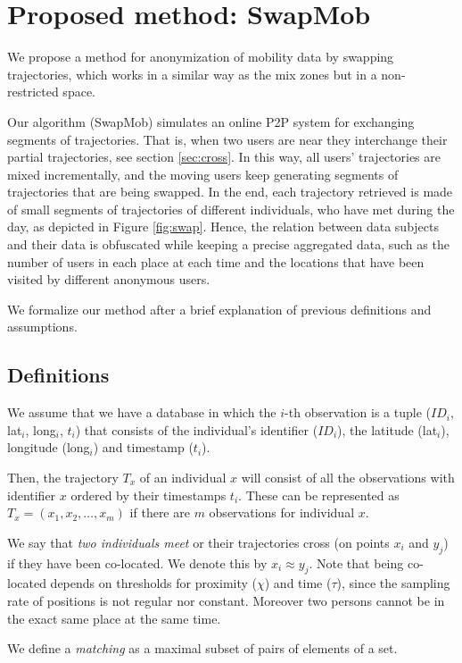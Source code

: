\documentclass{llncs}
\begin{document}
\section{Proposed method: SwapMob}

We propose a method for anonymization of mobility data by swapping trajectories, which works in a similar way as the mix zones but in a non-restricted space.


Our algorithm (SwapMob) simulates an online P2P system for exchanging segments of trajectories. That is, when two users are near they interchange their partial trajectories, see section \ref{sec:cross}.
In this way, all users' trajectories are mixed incrementally, and the moving users keep generating segments of trajectories that are being swapped. In the end, each trajectory retrieved is made of small segments of trajectories of different individuals, who have met during the day, as depicted in Figure \ref{fig:swap}. Hence, the relation between data subjects and their data is obfuscated while keeping a precise aggregated data, such as the number of users in each place at each time and the locations that have been visited by different anonymous users.

We formalize our method after a brief explanation of previous definitions and assumptions.

\subsection{Definitions}
We assume that we have a database in which the $i$-th observation is a tuple ($ID_i$, lat$_i$, long$_i$, $t_i$) that
consists of the individual's identifier ($ID_i$), the latitude (lat$_i$), longitude (long$_i$) and timestamp ($t_i$).

Then, the trajectory $T_x$ of an individual \texttt{$x$} will consist of all the observations with identifier \texttt{$x$} ordered by their timestamps \texttt{$t_i$}.
These can be represented as $T_x = (x_1, x_2, \ldots, x_m)$ if there are $m$ observations for individual $x$.


We say that \emph{two individuals meet} or their trajectories cross (on points $x_i$ and $y_j$) if they have been co-located. We denote this by $x_i \approx y_j$. Note that being co-located depends on thresholds for proximity ($\chi$) and time ($\tau$), since the sampling rate of positions is not regular nor constant. Moreover two persons cannot be in the exact same place at the same time.

We define a \emph{matching} as a maximal subset of pairs of elements of a set.
\end{document}
